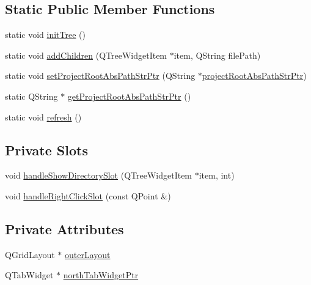 \subsection*{Static Public Member Functions}
\begin{DoxyCompactItemize}
\item 
static void \hyperlink{class_file_tree_gui_a5d4df4a19da0183ccc254019f77097b1}{init\-Tree} ()
\item 
static void \hyperlink{class_file_tree_gui_ab3c2fd5311245c08624461ac4c7e120c}{add\-Children} (Q\-Tree\-Widget\-Item $\ast$item, Q\-String file\-Path)
\item 
static void \hyperlink{class_file_tree_gui_afe882583424429fcda9c4c2bc0ab71d4}{set\-Project\-Root\-Abs\-Path\-Str\-Ptr} (Q\-String $\ast$\hyperlink{class_file_tree_gui_a9ce991f8f95f583aa5fb1bec7a9bcd4c}{project\-Root\-Abs\-Path\-Str\-Ptr})
\item 
static Q\-String $\ast$ \hyperlink{class_file_tree_gui_a21607e8cda6732997d5148581017a9b8}{get\-Project\-Root\-Abs\-Path\-Str\-Ptr} ()
\item 
static void \hyperlink{class_file_tree_gui_ac2c3399b5cb85da5cd1c119b61c674c0}{refresh} ()
\end{DoxyCompactItemize}
\subsection*{Private Slots}
\begin{DoxyCompactItemize}
\item 
void \hyperlink{class_file_tree_gui_aa8110a99d6bab64818b7f87024382b2a}{handle\-Show\-Directory\-Slot} (Q\-Tree\-Widget\-Item $\ast$item, int)
\item 
void \hyperlink{class_file_tree_gui_a9d726b5258284de8f9dc10cddddbdc87}{handle\-Right\-Click\-Slot} (const Q\-Point \&)
\end{DoxyCompactItemize}
\subsection*{Private Attributes}
\begin{DoxyCompactItemize}
\item 
Q\-Grid\-Layout $\ast$ \hyperlink{class_file_tree_gui_aaf8b63a4775b1d46d635cdaef94b979a}{outer\-Layout}
\item 
Q\-Tab\-Widget $\ast$ \hyperlink{class_file_tree_gui_ae44c6d73787d55eae9bed8e16ff9f34a}{north\-Tab\-Widget\-Ptr}
\end{DoxyCompactItemize}
